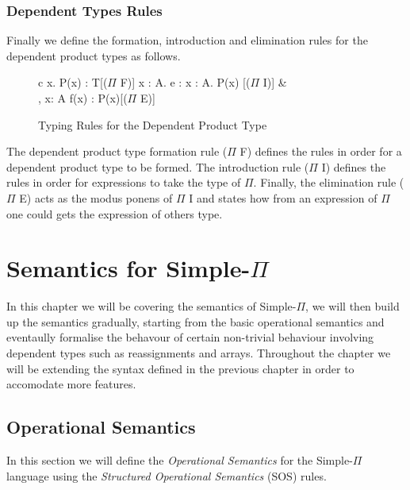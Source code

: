 \documentclass[a4paper,12pt]{report}
\begin{document}
\subsection{Dependent Types Rules}
Finally we define the formation, introduction and elimination rules for 
the dependent product types as follows.

\begin{figure}[H]
  \begin{center}
    \begin{tabular} {c}
        {\Gamma \vdash \Pi x. P(x) : T}[($\Pi$ F)] \text{ }
        {\Gamma \vdash \lambda x : A. e : \Pi x : A. P(x) }[($\Pi$ I)] & \\
        {\Gamma, x: A \vdash f(x) : P(x)}[($\Pi$ E)] \text{ }
    \end{tabular}
  \end{center}
  \caption{Typing Rules for the Dependent Product Type}
\end{figure}

\par
The dependent product type formation rule ($\Pi$ F) defines the rules in order 
for a dependent product type to be formed. The introduction rule ($\Pi$ I) 
defines the rules in order for expressions to take the type of $\Pi$. Finally, 
the elimination rule ($\Pi$ E) acts as the modus ponens of $\Pi$ I and states 
how from an expression of $\Pi$ one could gets the expression of others type. 


\chapter{Semantics for Simple-$\Pi$}
In this chapter we will be covering the semantics of Simple-$\Pi$, we will 
then build up the semantics gradually, starting from the basic 
operational semantics and eventaully formalise the behavour of certain 
non-trivial behaviour involving dependent types such as reassignments and 
arrays. Throughout the chapter we will be extending the syntax defined in the 
previous chapter in order to accomodate more features.

\section{Operational Semantics}
In this section we will define the \textit{Operational Semantics} 
\cite{operationalSemantics} for the Simple-$\Pi$ language 
using the \textit{Structured Operational Semantics} \cite{plotkinSOS} (SOS) rules. 
\end{document}
